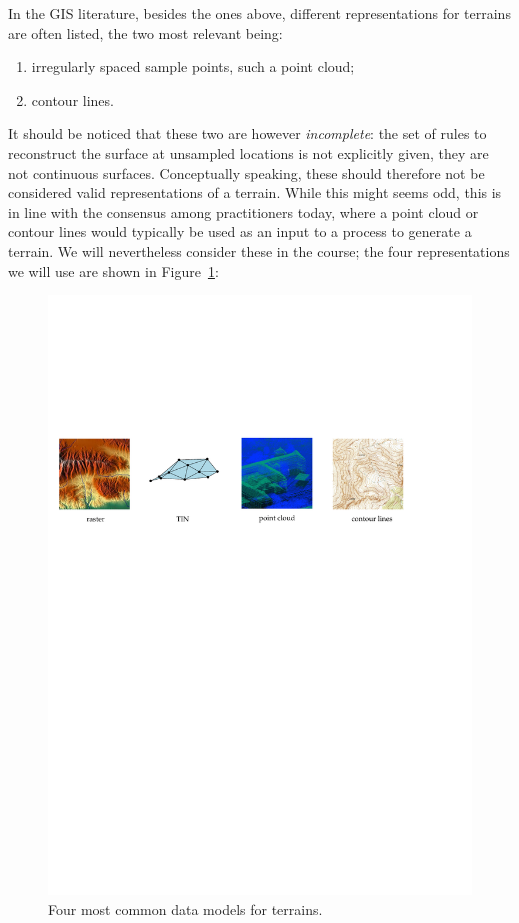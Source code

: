 In the GIS literature, besides the ones above, different representations for terrains are often listed, the two most relevant being:
\begin{enumerate}
  \item irregularly spaced sample points, such a point cloud; 
  \item contour lines.
\end{enumerate}
It should be noticed that these two are however \emph{incomplete}: the set of rules to reconstruct the surface at unsampled locations is not explicitly given, they are not continuous surfaces.
Conceptually speaking, these should therefore not be considered valid representations of a terrain.
While this might seems odd, this is in line with the consensus among practitioners today, where a point cloud or contour lines would typically be used as an input to a process to generate a terrain.
We will nevertheless consider these in the course; the four representations we will use are shown in Figure~\ref{fig:reps}: 
\begin{figure}
  \centering
  \includegraphics[width=0.95\linewidth]{figs/reps}
  \caption{Four most common data models for terrains.}
\label{fig:reps}
\end{figure}

